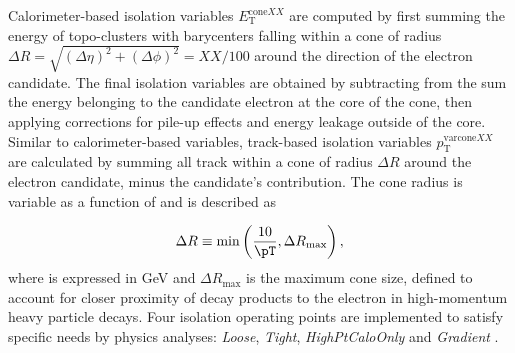 \documentclass[../thesis.tex]{subfiles}
\begin{document}
Calorimeter-based isolation variables $E_\mathrm{T}^{\mathrm{cone}XX}$ are computed by first summing the energy of topo-clusters with barycenters falling within a cone of radius $\Delta R = \sqrt{(\Delta \eta)^2+(\Delta \phi)^2}=XX/100$ around the direction of the electron candidate. The final isolation variables are obtained by subtracting from the sum the energy belonging to the candidate electron at the core of the cone, then applying corrections for pile-up effects and energy leakage outside of the core. Similar to calorimeter-based variables, track-based isolation variables $p_\mathrm{T}^{\mathrm{varcone}XX}$ are calculated by summing all track \pT within a cone of radius $\Delta R$ around the electron candidate, minus the candidate's contribution. The cone radius is variable as a function of \pT and is described as

\begin{equation}
\Delta R \equiv \min \left(\frac{10}{\pT}, \Delta R_{\max} \right),
\end{equation}
where \pT is expressed in GeV and $\Delta R_{\max}$ is the maximum cone size, defined to account for closer proximity of decay products to the electron in high-momentum heavy particle decays. Four isolation operating points are implemented to satisfy specific needs by physics analyses: \textit{Loose}, \textit{Tight}, \textit{HighPtCaloOnly} and \textit{Gradient} \citep{reco:electron_id}.

\end{document}
